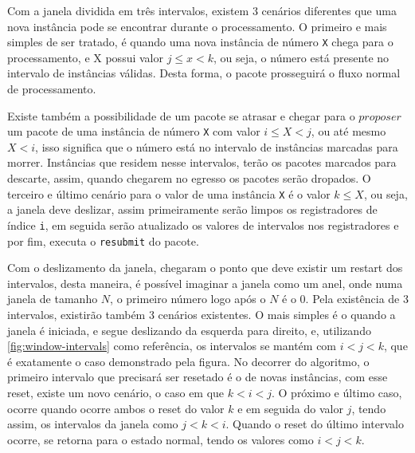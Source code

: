 \documentclass[
    12pt,
    openright, 
    oneside,
    a4paper,
    french,
    english,
    brazil
    ]{facom-ufu-abntex2}
\theoremstyle{definition}
\begin{document}
Com a janela dividida em três intervalos, existem 3 cenários diferentes que uma nova instância pode se encontrar durante o
processamento. O primeiro e mais simples de ser tratado, é quando uma nova instância de número \texttt{X} chega para
o processamento, e X possui valor $j \leq x < k$, ou seja, o número está presente no intervalo de instâncias válidas. 
Desta forma, o pacote prosseguirá o fluxo normal de processamento.

Existe também a possibilidade de um pacote se atrasar e chegar para o $proposer$ um pacote de uma instância de número
\texttt{X} com valor $i \leq X < j$, ou até mesmo $X < i$, isso significa que o número está no intervalo de instâncias
marcadas para morrer. Instâncias que residem nesse intervalos, terão os pacotes marcados para descarte, assim, quando
chegarem no egresso os pacotes serão dropados.
O terceiro e último cenário para o valor de uma instância \texttt{X} é o valor $k \leq X$, ou seja, a janela deve deslizar,
assim primeiramente serão limpos os registradores de índice \texttt{i}, em seguida serão atualizado os valores de
intervalos nos registradores e por fim, executa o \texttt{resubmit} do pacote.

Com o deslizamento da janela, chegaram o ponto que deve existir um restart dos intervalos, desta maneira, é possível
imaginar a janela como um anel, onde numa janela de tamanho $N$, o primeiro número logo após o $N$ é o 0. Pela 
existência de 3 intervalos, existirão também 3 cenários existentes. O mais simples é o quando a janela é iniciada,
e segue deslizando da esquerda para direito, e, utilizando \ref{fig:window-intervals} como referência, os intervalos
se mantém com $i < j < k$, que é exatamente o caso demonstrado pela figura. No decorrer do algoritmo, o primeiro intervalo
que precisará ser resetado é o de novas instâncias, com esse reset, existe um novo cenário, o caso em que $k < i < j$.
O próximo e último caso, ocorre quando ocorre ambos o reset do valor $k$ e em seguida do valor $j$, tendo assim,
os intervalos da janela como $j < k < i$. Quando o reset do último intervalo ocorre, se retorna para o estado normal,
tendo os valores como $i < j < k$.
\end{document}
